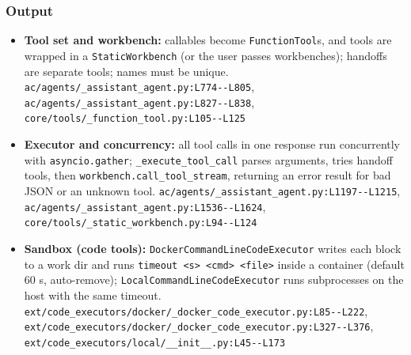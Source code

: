 \subsubsection*{Output}
\begin{itemize}
\item \textbf{Tool set and workbench:} callables become \texttt{FunctionTool}s, and tools are wrapped in a \texttt{StaticWorkbench} (or the user passes workbenches); handoffs are separate tools; names must be unique. \texttt{ac/\allowbreak{}agents/\allowbreak{}\_\allowbreak{}assistant\_\allowbreak{}agent.\allowbreak{}py:\allowbreak{}L774-\allowbreak{}-\allowbreak{}L805}, \texttt{ac/\allowbreak{}agents/\allowbreak{}\_\allowbreak{}assistant\_\allowbreak{}agent.\allowbreak{}py:\allowbreak{}L827-\allowbreak{}-\allowbreak{}L838}, \texttt{core/\allowbreak{}tools/\allowbreak{}\_\allowbreak{}function\_\allowbreak{}tool.\allowbreak{}py:\allowbreak{}L105-\allowbreak{}-\allowbreak{}L125}
\item \textbf{Executor and concurrency:} all tool calls in one response run concurrently with \texttt{asyncio.\allowbreak{}gather}; \texttt{\_\allowbreak{}execute\_\allowbreak{}tool\_\allowbreak{}call} parses arguments, tries handoff tools, then \texttt{workbench.\allowbreak{}call\_\allowbreak{}tool\_\allowbreak{}stream}, returning an error result for bad JSON or an unknown tool. \texttt{ac/\allowbreak{}agents/\allowbreak{}\_\allowbreak{}assistant\_\allowbreak{}agent.\allowbreak{}py:\allowbreak{}L1197-\allowbreak{}-\allowbreak{}L1215}, \texttt{ac/\allowbreak{}agents/\allowbreak{}\_\allowbreak{}assistant\_\allowbreak{}agent.\allowbreak{}py:\allowbreak{}L1536-\allowbreak{}-\allowbreak{}L1624}, \texttt{core/\allowbreak{}tools/\allowbreak{}\_\allowbreak{}static\_\allowbreak{}workbench.\allowbreak{}py:\allowbreak{}L94-\allowbreak{}-\allowbreak{}L124}
\item \textbf{Sandbox (code tools):} \texttt{DockerCommandLineCodeExecutor} writes each block to a work dir and runs \texttt{timeout <s> <cmd> <file>} inside a container (default 60 s, auto-remove); \texttt{LocalCommandLineCodeExecutor} runs subprocesses on the host with the same timeout. \texttt{ext/\allowbreak{}code\_\allowbreak{}executors/\allowbreak{}docker/\allowbreak{}\_\allowbreak{}docker\_\allowbreak{}code\_\allowbreak{}executor.\allowbreak{}py:\allowbreak{}L85-\allowbreak{}-\allowbreak{}L222}, \texttt{ext/\allowbreak{}code\_\allowbreak{}executors/\allowbreak{}docker/\allowbreak{}\_\allowbreak{}docker\_\allowbreak{}code\_\allowbreak{}executor.\allowbreak{}py:\allowbreak{}L327-\allowbreak{}-\allowbreak{}L376}, \texttt{ext/\allowbreak{}code\_\allowbreak{}executors/\allowbreak{}local/\allowbreak{}\_\allowbreak{}\_\allowbreak{}init\_\allowbreak{}\_\allowbreak{}.\allowbreak{}py:\allowbreak{}L45-\allowbreak{}-\allowbreak{}L173}

\end{itemize}
